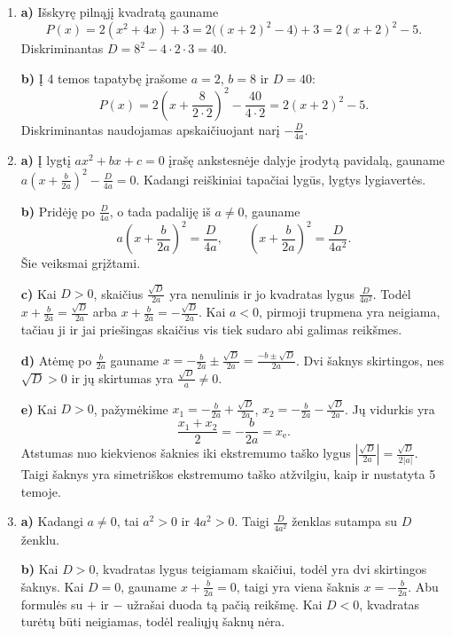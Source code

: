 \documentclass[12pt,a4paper]{article}
\begin{document}
\begin{enumerate}
\textbf{c)} $x^2-4x+5=(x-2)^2+1$. Lygtis $(x-2)^2=-1$ negalima, todėl realiųjų šaknų nėra.

\textbf{d)} $2x^2-8x+6=2(x^2-4x)+6=2\bigl((x-2)^2-4\bigr)+6=2(x-2)^2-2$. Iš $2(x-2)^2=2$ gauname $(x-2)^2=1$, todėl $x=1$ arba $x=3$. Patikra: $2-8+6=0$, $18-24+6=0$.
\item \textbf{a)} Išskyrę pilnąjį kvadratą gauname
\[
P(x)=2(x^2+4x)+3=2\bigl((x+2)^2-4\bigr)+3=2(x+2)^2-5.
\]
Diskriminantas $D=8^2-4\cdot2\cdot3=40$.

\textbf{b)} Į 4 temos tapatybę įrašome $a=2$, $b=8$ ir $D=40$:
\[
P(x)=2\left(x+\frac{8}{2\cdot2}\right)^2-\frac{40}{4\cdot2}
=2(x+2)^2-5.
\]
Diskriminantas naudojamas apskaičiuojant narį $-\frac{D}{4a}$.
\item \textbf{a)} Į lygtį $ax^2+bx+c=0$ įrašę ankstesnėje dalyje įrodytą pavidalą, gauname $a\left(x+\frac{b}{2a}\right)^2-\frac{D}{4a}=0$. Kadangi reiškiniai tapačiai lygūs, lygtys lygiavertės.

\textbf{b)} Pridėję po $\frac{D}{4a}$, o tada padaliję iš $a\ne0$, gauname
\[
a\left(x+\frac{b}{2a}\right)^2=\frac{D}{4a},\qquad
\left(x+\frac{b}{2a}\right)^2=\frac{D}{4a^2}.
\]
Šie veiksmai grįžtami.

\textbf{c)} Kai $D>0$, skaičius $\frac{\sqrt D}{2a}$ yra nenulinis ir jo kvadratas lygus $\frac{D}{4a^2}$. Todėl $x+\frac{b}{2a}=\frac{\sqrt D}{2a}$ arba $x+\frac{b}{2a}=-\frac{\sqrt D}{2a}$. Kai $a<0$, pirmoji trupmena yra neigiama, tačiau ji ir jai priešingas skaičius vis tiek sudaro abi galimas reikšmes.

\textbf{d)} Atėmę po $\frac{b}{2a}$ gauname $x=-\frac{b}{2a}\pm\frac{\sqrt D}{2a}=\frac{-b\pm\sqrt D}{2a}$. Dvi šaknys skirtingos, nes $\sqrt D>0$ ir jų skirtumas yra $\frac{\sqrt D}{a}\ne0$.

\textbf{e)} Kai $D>0$, pažymėkime $x_1=-\frac{b}{2a}+\frac{\sqrt D}{2a}$, $x_2=-\frac{b}{2a}-\frac{\sqrt D}{2a}$. Jų vidurkis yra
\[
\frac{x_1+x_2}{2}=-\frac{b}{2a}=x_{\mathrm e}.
\]
Atstumas nuo kiekvienos šaknies iki ekstremumo taško lygus $\left|\frac{\sqrt D}{2a}\right|=\frac{\sqrt D}{2|a|}$. Taigi šaknys yra simetriškos ekstremumo taško atžvilgiu, kaip ir nustatyta 5 temoje.
\item \textbf{a)} Kadangi $a\ne0$, tai $a^2>0$ ir $4a^2>0$. Taigi $\frac{D}{4a^2}$ ženklas sutampa su $D$ ženklu.

\textbf{b)} Kai $D>0$, kvadratas lygus teigiamam skaičiui, todėl yra dvi skirtingos šaknys. Kai $D=0$, gauname $x+\frac{b}{2a}=0$, taigi yra viena šaknis $x=-\frac{b}{2a}$. Abu formulės su $+$ ir $-$ užrašai duoda tą pačią reikšmę. Kai $D<0$, kvadratas turėtų būti neigiamas, todėl realiųjų šaknų nėra.


\end{enumerate}
\end{document}
